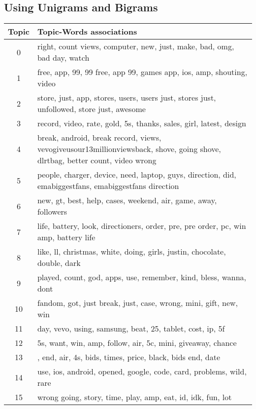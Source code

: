 \subsection{Using Unigrams and Bigrams}
\label{sec:using_unigrams_bigrams}
\begin{table}
  \begin{tabular}{c p{16cm}} \toprule
    Topic & Topic-Words associations \\ \midrule
    0     & right, count views, computer, new, just, make, bad, omg, bad day, watch \\ \midrule
    1     & free, app, 99, 99 free, app 99, games app, ios, amp, shouting, video \\ \midrule
    2     & store, just, app, stores, users, users just, stores just, unfollowed, store just, awesome \\ \midrule
    3     & record, video, rate, gold, 5s, thanks, sales, girl, latest, design \\ \midrule
    4     & break, android, break record, views, vevogiveusour13millionviewsback, shove, going shove, dlrtbag, better count, video wrong \\ \midrule
    5     & people, charger, device, need, laptop, guys, direction, did, emabiggestfans, emabiggestfans direction \\ \midrule
    6     & new, gt, best, help, cases, weekend, air, game, away, followers \\ \midrule
    7     & life, battery, look, directioners, order, pre, pre order, pc, win amp, battery life \\ \midrule
    8     & like, ll, christmas, white, doing, girls, justin, chocolate, double, dark \\ \midrule
    9     & played, count, god, apps, use, remember, kind, bless, wanna, dont \\ \midrule
    10    & fandom, got, just break, just, case, wrong, mini, gift, new, win \\ \midrule
    11    & day, vevo, using, samsung, beat, 25, tablet, cost, ip, 5f \\ \midrule
    12    & 5s, want, win, amp, follow, air, 5c, mini, giveaway, chance \\ \midrule
    13    & , end, air, 4s, bids, times, price, black, bids end, date \\ \midrule
    14    & use, ios, android, opened, google, code, card, problems, wild, rare \\ \midrule
    15    & wrong going, story, time, play, amp, eat, id, idk, fun, lot \\ \midrule

\end{tabular}
\end{table}
